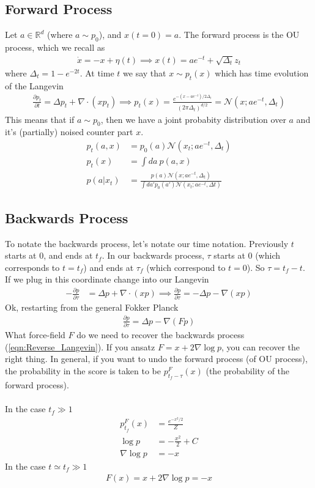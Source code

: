 \subsection{Forward Process}
Let $a \in \mathbb R^d$ (where $a \sim p_0$), and $x(t=0) = a$. The forward process is the OU process, which we recall as 
\begin{align}
	\dot x = -x + \eta(t) \implies x(t) = a e^{-t} + \sqrt{\Delta_t} z_t
\end{align}
where $\Delta_t = 1 - e^{-2t}$.
At time $t$ we say that $x \sim p_t(x)$ which has time evolution of the Langevin
\begin{align}
	\frac{\partial p_t}{\partial t} = \Delta p_t + \nabla \cdot (x p_t) \implies p_t(x) = \frac{e^{-(x-ae^{-t})/2\Delta_t}}{(2\pi \Delta_t)^{d/2}} =  \mathcal N(x; a e^{-t}, \Delta_t)
\end{align}
This means that if $a \sim p_0$, then we have a joint probabity distribution over $a$ and it's (partially) noised counter part $x$.
\begin{align}
	p_t(a,x) &= p_0(a) \mathcal N(x_t; ae^{-t} , \Delta_t)\\
	p_t(x) &= \int da ~ p(a,x)\\
	p(a | x_t) &= \frac{p(a)  \mathcal N(x; ae^{-t} , \Delta_t)}{\int d a' p_0(a') \mathcal N(x_t; a e^{-t}, \Delta t)}
\end{align}

\subsection{Backwards Process}
To notate the backwards process, let's notate our time notation. Previously $t$ starts at 0, and ends at $t_f$. In our backwards process, $\tau$ starts at 0 (which corresponds to $t=t_f$) and ends at $\tau_f$ (which correspond to $t=0$). So $\tau = t_f -t$. If we plug in this coordinate change into our Langevin
\begin{align}
	-\frac{\partial p}{\partial \tau} & = \Delta p + \nabla \cdot(x p) \implies \frac{\partial p}{\partial \tau}  = -\Delta p - \nabla (x p) \label{eqn:Reverse_Langevin}
\end{align}
Ok, restarting from the general Fokker Planck
\begin{align}
	\frac{\partial p}{\partial \tau} = \Delta p - \nabla (F p)
\end{align}
What force-field $F$ do we need to recover the backwards process (\ref{eqn:Reverse_Langevin}). If you ansatz $F = x + 2 \nabla \log p$, you can recover the right thing. In general, if you want to undo the forward process (of OU process), the probability in the score is taken to be $p_{t_f-\tau }^F(x)$ (the probability of the forward process).\\
\\
In the case $t_f \gg 1$
\begin{align}
	p_{t_f}^F (x) & = \frac{e^{-x^2/2}}{Z}\\
	\log p & = - \frac{x^2}{2} + C\\
	\nabla \log p & = -x
\end{align}
In the case $t \simeq t_f \gg 1$
\begin{align}
	F(x) = x + 2 \nabla \log p = -x
\end{align}

